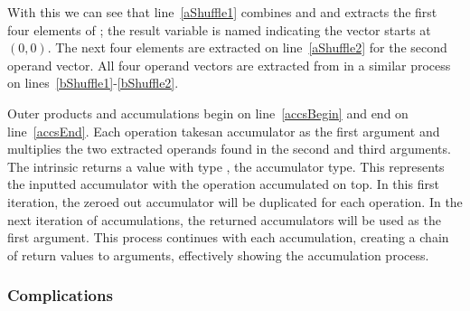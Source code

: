 \documentclass[\main/thesis.tex]{subfiles}
\begin{document}
With this we can see that line~\ref{aShuffle1} combines  and  and extracts the first four elements of ; the result variable is named  indicating the vector starts at $(0, 0)$.
The next four elements are extracted on line~\ref{aShuffle2} for the second operand vector.
All four operand vectors are extracted from  in a similar process on lines~\ref{bShuffle1}-\ref{bShuffle2}.

Outer products and accumulations begin on line~\ref{accsBegin} and end on line~\ref{accsEnd}.
Each operation takesan accumulator as the first argument and multiplies the two extracted operands found in the second and third arguments.
The  intrinsic returns a value with type , the accumulator type.
This represents the inputted accumulator with the operation accumulated on top.
In this first iteration, the zeroed out accumulator will be duplicated for each operation.
In the next iteration of accumulations, the returned accumulators will be used as the first argument.
This process continues with each accumulation, creating a chain of return values to arguments, effectively showing the accumulation process.

\subsubsection{Complications}
\label{sec:complications}
\end{document}
